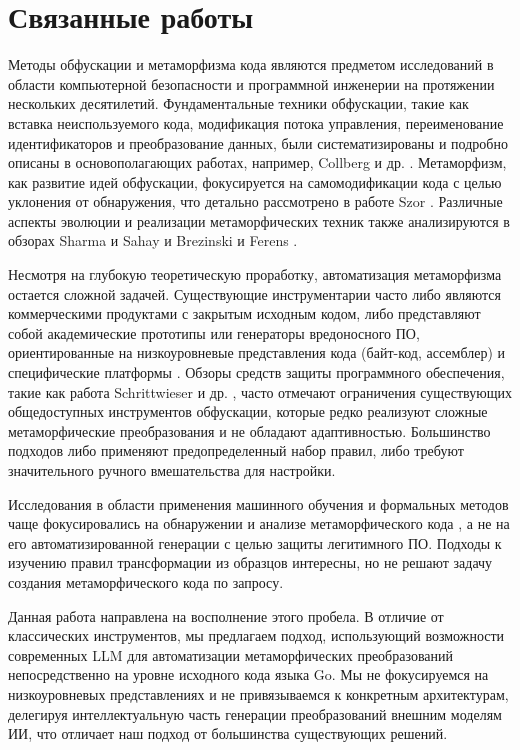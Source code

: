
\section{Связанные работы}
\label{sec:literature}
Методы обфускации и метаморфизма кода являются предметом исследований в области компьютерной безопасности и программной инженерии на протяжении нескольких десятилетий. Фундаментальные техники обфускации, такие как вставка неиспользуемого кода, модификация потока управления, переименование идентификаторов и преобразование данных, были систематизированы и подробно описаны в основополагающих работах, например, Collberg и др. \cite{Collberg97Survey}. Метаморфизм, как развитие идей обфускации, фокусируется на самомодификации кода с целью уклонения от обнаружения, что детально рассмотрено в работе Szor \cite{Szor05Metamorphic}. Различные аспекты эволюции и реализации метаморфических техник также анализируются в обзорах Sharma и Sahay \cite{Sharma14Evolution} и Brezinski и Ferens \cite{Brezinski21Survey}.

Несмотря на глубокую теоретическую проработку, автоматизация метаморфизма остается сложной задачей. Существующие инструментарии часто либо являются коммерческими продуктами с закрытым исходным кодом, либо представляют собой академические прототипы или генераторы вредоносного ПО, ориентированные на низкоуровневые представления кода (байт-код, ассемблер) и специфические платформы \cite{Brezinski21Survey}. Обзоры средств защиты программного обеспечения, такие как работа Schrittwieser и др. \cite{Schrittwieser16Survey}, часто отмечают ограничения существующих общедоступных инструментов обфускации, которые редко реализуют сложные метаморфические преобразования и не обладают адаптивностью. Большинство подходов либо применяют предопределенный набор правил, либо требуют значительного ручного вмешательства для настройки.

Исследования в области применения машинного обучения и формальных методов чаще фокусировались на обнаружении и анализе метаморфического кода \cite{Wong06Hunting, Campion21Learning}, а не на его автоматизированной генерации с целью защиты легитимного ПО. Подходы к изучению правил трансформации из образцов \cite{Campion21Learning} интересны, но не решают задачу создания метаморфического кода по запросу.

Данная работа направлена на восполнение этого пробела. В отличие от классических инструментов, мы предлагаем подход, использующий возможности современных LLM для автоматизации метаморфических преобразований непосредственно на уровне исходного кода языка Go. Мы не фокусируемся на низкоуровневых представлениях и не привязываемся к конкретным архитектурам, делегируя интеллектуальную часть генерации преобразований внешним моделям ИИ, что отличает наш подход от большинства существующих решений.
